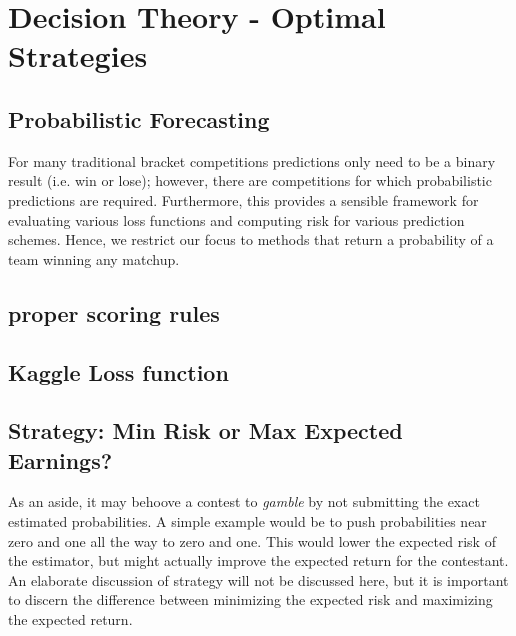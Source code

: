\section{Decision Theory - Optimal Strategies}
\subsection{Probabilistic Forecasting}
For many traditional bracket competitions predictions only need to be a binary result (i.e. win or lose); however, there are competitions for which probabilistic predictions  are required.  Furthermore, this provides a sensible framework for evaluating various loss functions and computing risk for various prediction schemes.  Hence, we restrict our focus to methods that return a probability of a team winning any matchup.

\subsection{proper scoring rules}
\subsection{Kaggle Loss function}
\subsection{Strategy: Min Risk or Max Expected Earnings?}
As an aside, it may behoove a contest to \emph{gamble} by not submitting the exact estimated probabilities.  A simple example would be to push probabilities near zero and one all the way to zero and one.  This would lower the expected risk of the estimator, but might actually improve the expected return for the contestant.  An elaborate discussion of strategy will not be discussed here, but it is important to discern the difference between minimizing the expected risk and maximizing the expected return.